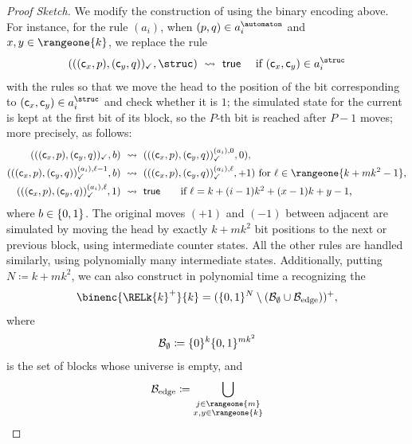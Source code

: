 \documentclass[a4paper,UKenglish,cleveref, autoref, thm-restate]{lipics-v2021}
\DeclarePairedDelimiter\set{\{}{\}}
\DeclarePairedDelimiter\tuple{(}{)}
\newcommand{\const}[1]{\mathsf{#1}}
\newcommand{\defeq}{\coloneq}
\begin{document}
\begin{proof}[Proof Sketch]
    We modify the construction of 
    using the binary encoding above.
    For instance, for the rule $(a_i)$,
    when $\tuple{p, q} \in a_i^{\automaton}$ and $x,y\in\rangeone{k}$,
    we replace the rule
    \[\tuple{\tuple{\tuple{\const{c}_x, p}, \tuple{\const{c}_y, q}}_{\checkmark}, \struc} ~\leadsto~ \const{true} \quad\text{ if $\tuple{\const{c}_x, \const{c}_y} \in a_i^{\struc}$}\]
    with the rules so that
    we move the head to the position of the bit corresponding to $\tuple{\const{c}_x, \const{c}_y} \in a_i^{\struc}$ and check whether it is $1$;
    the simulated state for the current  is kept at the first bit of its block, so the $P$-th bit is reached after $P-1$ moves;
    more precisely, as follows:
    \begin{align*}
        \tuple{\tuple{\tuple{\const{c}_x, p}, \tuple{\const{c}_y, q}}_{\checkmark}, b} &~\leadsto~ \tuple{\tuple{\tuple{\const{c}_x, p}, \tuple{\const{c}_y, q}}_{\checkmark}^{(a_i), 0}, 0},\\
        \tuple{\tuple{\tuple{\const{c}_x, p}, \tuple{\const{c}_y, q}}_{\checkmark}^{(a_i), \ell-1}, b} &~\leadsto~ \tuple{\tuple{\tuple{\const{c}_x, p}, \tuple{\const{c}_y, q}}_{\checkmark}^{(a_i), \ell}, +1} \text{ for $\ell \in \rangeone{k + m k^2 - 1}$,}\\
        \tuple{\tuple{\tuple{\const{c}_x, p}, \tuple{\const{c}_y, q}}_{\checkmark}^{(a_i), \ell}, 1} &~\leadsto~ \const{true} \tag*{if $\ell = k + (i-1)k^2 + (x-1)k + y - 1$,}
    \end{align*}
    where $b \in \set{0, 1}$.
    The original moves $(+1)$ and $(-1)$ between adjacent  are simulated by moving the head by exactly $k + m k^2$ bit positions to the next or previous block, using intermediate counter states.
    All the other rules are handled similarly, using polynomially many intermediate states.
    Additionally, putting $N \defeq k + m k^2$,
    we can also construct in polynomial time a  recognizing the 
    \[
        \binenc{\RELk{k}^{+}}{k} = (\set{0,1}^{N} \setminus (\mathcal{B}_{\emptyset} \cup \mathcal{B}_{\mathrm{edge}}))^{+},
    \]
    where
    \[
        \mathcal{B}_{\emptyset} \defeq \set{0}^{k}\set{0,1}^{mk^2}
    \]
    is the set of blocks whose universe is empty, and
    \begin{align*}
        \mathcal{B}_{\mathrm{edge}}
        \defeq
        \bigcup_{\substack{j \in \rangeone{m}\\ x,y \in \rangeone{k}}}

\end{align*}
\end{proof}
\end{document}
